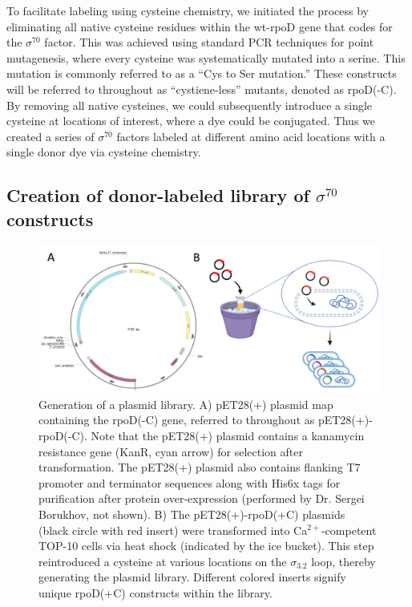 To facilitate labeling using cysteine chemistry, we initiated the process by eliminating all native cysteine residues within the \ac{wt-rpoD} gene that codes for the $\sigma^{70}$ factor. 
This was achieved using standard \ac{PCR} techniques for point mutagenesis, where every cysteine was systematically mutated into a serine. 
This mutation is commonly referred to as a \enquote{Cys to Ser mutation.} 
These constructs will be referred to throughout as \enquote{cystiene-less} mutants, denoted as rpoD(-C).
By removing all native cysteines, we could subsequently introduce a single cysteine at locations of interest, where a dye could be conjugated. 
Thus we created a series of $\sigma^{70}$ factors labeled at different amino acid locations with a single donor dye via cysteine chemistry.

\subsection{Creation of donor-labeled library of $\sigma^{70}$ constructs}
\label{sec:plasmid_lib_exp}

\begin{figure}
    \centering
    \includegraphics[width=\textwidth]{chapters/figures/plasmid_library.jpg}
    \caption{\label{fig:plasmid_library} 
    Generation of a plasmid library.
    A) pET28(+) plasmid map containing the rpoD(-C) gene, referred to throughout as pET28(+)-rpoD(-C).
    Note that the pET28(+) plasmid contains a kanamycin resistance gene (KanR, cyan arrow) for selection after transformation.
    The pET28(+) plasmid also contains flanking T7 promoter and terminator sequences along with His6x tags for purification after protein over-expression (performed by Dr. Sergei Borukhov, not shown).
    B) The pET28(+)-rpoD(+C) plasmids (black circle with red insert) were transformed into Ca$^{2+}$-competent TOP-10 cells via heat shock (indicated by the ice bucket). 
    This step reintroduced a cysteine at various locations on the $\sigma_{3.2}$ loop, thereby generating the plasmid library. 
    Different colored inserts signify unique rpoD(+C) constructs within the library.
    }
\end{figure}

